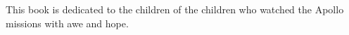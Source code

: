 % 
% 

\thispagestyle{empty}
\begin{dedication}
This book is dedicated to the children of the children who watched the Apollo missions with awe and hope.
\end{dedication}

\newpage
\thispagestyle{empty}